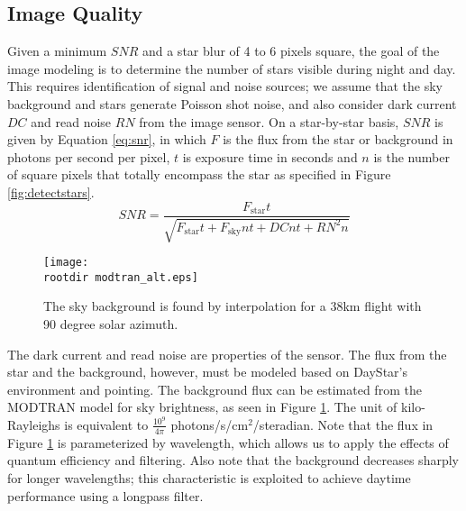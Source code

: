 \documentclass[twocolumn,letterpaper]{IEEEAerospace2012}
\newcommand{\rootdir}{./Figures/}
\newcommand{\RN}{\mathit{RN}}
\newcommand{\DC}{\mathit{DC}}
\newcommand{\SNR}{\mathit{SNR}}
\newcommand{\sub}[1]{\text{#1}} %
\begin{document}
\subsection{Image Quality}
Given a minimum $\SNR$ and a star blur of 4 to 6 pixels square, the goal of the image modeling is to determine the number of stars visible during night and day. This requires identification of signal and noise sources; we assume that the sky background and stars generate Poisson shot noise, and also consider dark current $\DC$ and read noise $\RN$ from the image sensor. On a star-by-star basis, $\SNR$ is given by Equation \ref{eq:snr}, in which $F$ is the flux from the star or background in photons per second per pixel, $t$ is exposure time in seconds and $n$ is the number of square pixels that totally encompass the star as specified in Figure \ref{fig:detectstars}.
\begin{equation}
    \label{eq:snr}
    \SNR = \frac{F_{\sub{star}}t}{\sqrt{F_{\sub{star}} t + F_{\sub{sky}} n t + \DC n t + \RN^2 n }}
\end{equation}

\begin{figure}[H]
    \centering
    \texttt{[image: \\rootdir modtran\_alt.eps]}
    \caption{The sky background is found by interpolation for a 38km flight with 90 degree solar azimuth.}
    \label{fig:modtran}
\end{figure}
The dark current and read noise are properties of the sensor. The flux from the star and the background, however, must be modeled based on DayStar's environment and pointing. The background flux can be estimated from the MODTRAN \cite{young2012} model for sky brightness, as seen in Figure \ref{fig:modtran}. The unit of kilo-Rayleighs is equivalent to $\frac{10^{9}}{4\pi}$ photons/s/cm$^2$/steradian. Note that the flux in Figure \ref{fig:modtran} is parameterized by wavelength, which allows us to apply the effects of quantum efficiency and filtering. Also note that the background decreases sharply for longer wavelengths; this characteristic is exploited to achieve daytime performance using a longpass filter.
\end{document}
